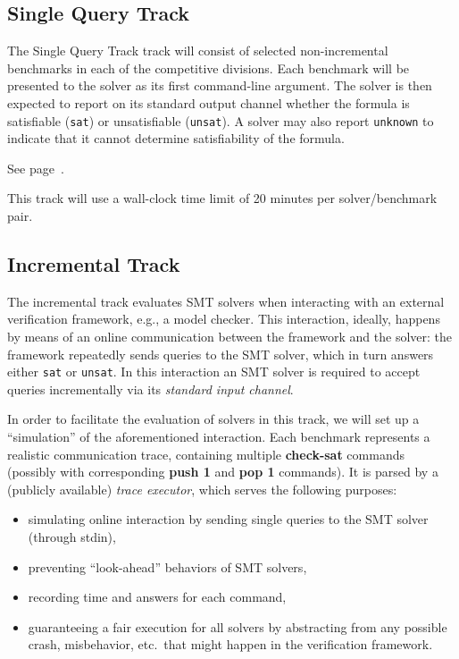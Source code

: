 \documentclass[12pt]{article}
\newcommand{\akey}[1]{\textbf{#1}\xspace}
\newcommand{\maintrack}{Single Query Track\xspace}
\begin{document}
\subsection{\maintrack}
\label{sec:exec:single}

The \maintrack track will consist of selected non-incremental benchmarks in
each of the competitive divisions.  Each benchmark will be presented to
the solver as its first command-line argument.  The solver is then expected to
report on its standard output channel whether the formula is satisfiable
(\texttt{sat}) or unsatisfiable (\texttt{unsat}).  A solver may also report
\texttt{unknown} to indicate that it cannot determine satisfiability of the
formula.

 See page~\pageref{benchmark-selection}.

This track will use a wall-clock time limit of 20 minutes per solver/benchmark
pair.

\subsection{Incremental Track}
\label{sec:exec:app}

The incremental track evaluates SMT solvers when interacting with an
external verification framework, e.g., a model checker. This
interaction, ideally, happens by means of an online communication
between the framework and the solver: the framework repeatedly sends
queries to the SMT solver, which in turn answers either \texttt{sat}
or \texttt{unsat}.  In this interaction an SMT solver is required to
accept queries incrementally via its \emph{standard input channel}.

In order to facilitate the evaluation of solvers in this track, we will set up
a ``simulation'' of the aforementioned interaction.  Each benchmark represents
a realistic communication trace, containing multiple \akey{check-sat} commands
(possibly with corresponding \akey{push 1} and \akey{pop 1} commands). It is
parsed by a (publicly available) \emph{trace executor},
which serves the following purposes:

\begin{itemize}
  \item simulating online interaction by sending single queries to the SMT
    solver (through stdin),
  \item preventing ``look-ahead'' behaviors of SMT solvers,
  \item recording time and answers for each command,
  \item guaranteeing a fair execution for all solvers by abstracting
  from any possible crash, misbehavior, etc.\ that might happen in the
  verification framework.
\end{itemize}
\end{document}
